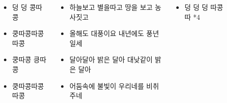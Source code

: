 \documentclass[20pt, a1paper ]{tikzposter}
\begin{document}
\begin{columns}
{		}

		{
			\setlength{\leftmargini}{2em}			
			\setlength{\labelsep}{1em} 
			\begin{LARGE}
			\begin{itemize}

			\item 덩 덩 콩따콩
			\item 쿵따콩따콩따콩
			\item 쿵따콩 킁따콩
			\item 쿵따콩따콩따콩

			\end{itemize}
			\end{LARGE}
		}






		{

			\setlength{\leftmargini}{2em}			
			\setlength{\labelsep}{1em} 
			\begin{LARGE}
			\begin{itemize}

			\item 하늘보고 별을따고 땅을 보고 농사짓고
			\item 올해도 대풍이요 내년에도 풍년일세
			\item 달아달아 밝은 달아 대낮같이 밝은 달아
			\item 어둠속에 불빛이 우리네를 비취주네

			\end{itemize}
			\end{LARGE}
		}


		{
			\setlength{\leftmargini}{2em}			
			\setlength{\labelsep}{1em} 
			\begin{LARGE}
			\begin{itemize}

			\item 덩 덩 덩 따콩따 *4

			\end{itemize}
			\end{LARGE}
		}

		{
			\setlength{\leftmargini}{2em}			
			\setlength{\labelsep}{1em} 
			\begin{LARGE}
			\begin{itemize}


\end{itemize}
\end{LARGE}}
\end{columns}
\end{document}
